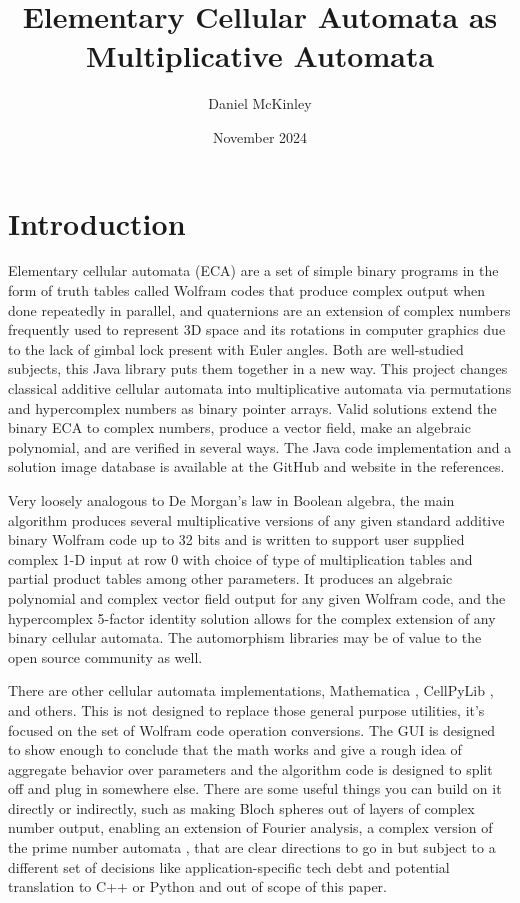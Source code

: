 \documentclass[11pt]{article}
\title{Elementary Cellular Automata as Multiplicative Automata}
\date{November 2024}
\author{Daniel McKinley}
\begin{document}
\maketitle


\section{Introduction}

Elementary cellular automata (ECA) are a set of simple binary programs in the form of truth tables called Wolfram codes that produce complex output when done repeatedly in parallel, and quaternions are an extension of complex numbers frequently used to represent 3D space and its rotations in computer graphics due to the lack of gimbal lock present with Euler angles. Both are well-studied subjects, this Java library puts them together in a new way. This project changes classical additive cellular automata into multiplicative automata \cite{Wolfram} via permutations and hypercomplex numbers as binary pointer arrays. Valid solutions extend the binary ECA to complex numbers, produce a vector field, make an algebraic polynomial, and are verified in several ways. The Java code implementation \cite{mygit} and a solution image database \cite{dmwebsite} is available at the GitHub and website in the references.

 Very loosely analogous to De Morgan's law in Boolean algebra, the main algorithm produces several multiplicative versions of any given standard additive binary Wolfram code up to 32 bits and is written to support user supplied complex 1-D input at row 0 with choice of type of multiplication tables and partial product tables among other parameters. It produces an algebraic polynomial and complex vector field output for any given Wolfram code, and the hypercomplex 5-factor identity solution allows for the complex extension of any binary cellular automata.  The automorphism libraries may be of value to the open source community as well. 

There are other cellular automata implementations, Mathematica \cite{Mathematica}, CellPyLib \cite{Antunes2021}, and others. This is not designed to replace those general purpose utilities, it's focused on the set of Wolfram code operation conversions. The GUI is designed to show enough to conclude that the math works and give a rough idea of aggregate behavior over parameters and the algorithm code is designed to split off and plug in somewhere else. There are some useful things you can build on it directly or indirectly, such as making Bloch spheres out of layers of complex number output, enabling an extension of Fourier analysis, a complex version of the prime number automata \cite{Wolfram}, that are clear directions to go in but subject to a different set of decisions like application-specific tech debt and potential translation to C++ or Python and out of scope of this paper.
\end{document}
